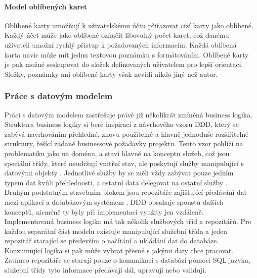 		\paragraph{Model oblíbených karet}


		Oblíbené karty umožňují k uživatelskému účtu přiřazovat cizí karty jako oblíbené.
		Každý účet může jako oblíbené označit libovolný počet karet, což danému uživateli umožní rychlý přístup
		k požadovaných informacím.
		Každá oblíbená karta navíc může mít jednu textovou poznámku s formátováním.
		Oblíbené karty je pak možné seskupovat do složek definovaných uživatelem pro lepší orientaci.
		Složky, poznámky ani oblíbené karty však nevidí nikdo jiný než autor.

		\subsubsection{Práce s datovým modelem}

		Práci s datovým modelem zastřešuje právě již několikrát zmíněná business logika.
		Struktura business logiky si bere inspiraci z návrhového vzoru \ac{DDD}, který se zabývá
		navrhováním přehledné, znovu použitelné a hlavně jednoduše rozšiřitelné struktury, řešící zadané businessové požadavky
		projektu.
		Tento vzor pohlíží na problematiku jako na doménu, a staví hlavně na konceptu služeb,
		což jsou speciální třídy, které
		neudržují vnitřní stav, ale poskytují služby manipulující s datovými objekty \cite{ddd_quickly}.
		Jednotlivé služby by se měli vždy zabývat pouze jedním typem dat kvůli přehlednosti, a ostatní data delegovat na
		ostatní služby \cite{ddd_quickly}.
		Druhým podstatným stavebním blokem jsou repozitáře zajišťující předávání dat mezi aplikací a databázovým systémem
		\cite{ddd_quickly}.
		\ac{DDD} obsahuje spoustu dalších konceptů, nicméně ty byly při implementaci využity jen vzdáleně.
		Implementovaná business logika má tak několik službových tříd a repozitářů.
		Pro každou separátní část modelu existuje manipulující služební třída a jeden repozitář starající se především o
		načítání a ukládání dat do databáze.
		Konzumující logika si pak může vybrat přesně s jakými daty chce pracovat.
		Zatímco repozitáře se starají pouze o komunikaci s databází pomocí \ac{SQL} jazyka,
		služební třídy tyto informace předávají dál, upravují nebo validují.


